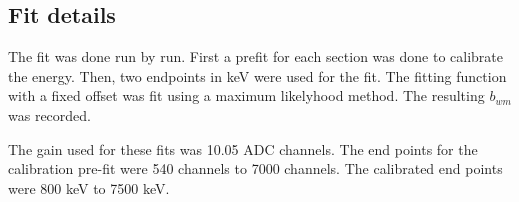  
 
\subsection{Fit details}
The fit was done run by run.
First a prefit for each section was done to calibrate the energy.
Then, two endpoints in keV were used for the fit.
The fitting function with a fixed offset was fit using a maximum likelyhood method.
The resulting $b_{wm}$ was recorded.

The gain used for these fits was 10.05 ADC channels.
The end points for the calibration pre-fit were 540 channels to 7000 channels.
The calibrated end points were 800 keV to 7500 keV. 
 
